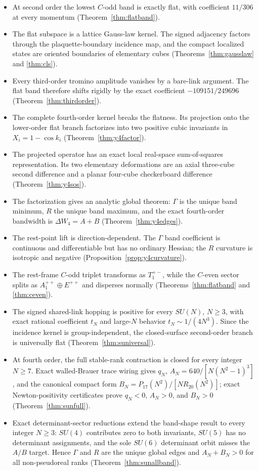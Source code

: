 \documentclass[11pt]{article}
\begin{document}
\begin{itemize}
\item[(A)] At second order the lowest $C$-odd band is exactly flat, with
coefficient $11/306$ at every momentum (Theorem~\ref{thm:flatband}).
\item[(B)] The flat subspace is a lattice Gauss-law kernel. The signed
adjacency factors through the plaquette-boundary incidence map, and the
compact localized states are oriented boundaries of elementary cubes
(Theorems~\ref{thm:gausslaw} and \ref{thm:cls}).
\item[(C)] Every third-order tromino amplitude vanishes by a bare-link
argument. The flat band therefore shifts rigidly by the exact coefficient
$-109151/249696$ (Theorem~\ref{thm:thirdorder}).
\item[(D)] The complete fourth-order kernel breaks the flatness. Its
projection onto the lower-order flat branch factorizes into two positive
cubic invariants in $X_i=1-\cos k_i$ (Theorem~\ref{thm:y4factor}).
\item[(E)] The projected operator has an exact local real-space
sum-of-squares representation. Its two elementary deformations are an axial
three-cube second difference and a planar four-cube checkerboard difference
(Theorem~\ref{thm:y4sos}).
\item[(F)] The factorization gives an analytic global theorem: $\Gamma$ is
the unique band minimum, $R$ the unique band maximum, and the exact
fourth-order bandwidth is $\Delta W_4=A+B$
(Theorem~\ref{thm:y4edges}).
\item[(G)] The rest-point lift is direction-dependent. The $\Gamma$ band
coefficient is continuous and differentiable but has no ordinary Hessian;
the $R$ curvature is isotropic and negative
(Proposition~\ref{prop:y4curvature}).
\item[(H)] The rest-frame $C$-odd triplet transforms as $T_1^{+-}$, while
the $C$-even sector splits as $A_1^{++}\oplus E^{++}$ and disperses normally
(Theorems~\ref{thm:flatband} and \ref{thm:ceven}).
\item[(I)] The signed shared-link hopping is positive for every $SU(N)$,
$N\geq3$, with exact rational coefficient $t_N$ and large-$N$ behavior
$t_N\sim1/(4N^3)$. Since the incidence kernel is group-independent, the
closed-surface second-order branch is universally flat
(Theorem~\ref{thm:suniversal}).
\item[(J)] At fourth order, the full stable-rank contraction is closed for
every integer $N\geq7$. Exact walled-Brauer trace wiring gives $q_N$,
$A_N=640/[N(N^2-1)^3]$, and the canonical compact form
$B_N=P_{17}(N^2)/[N R_{20}(N^2)]$; exact Newton-positivity certificates prove
$q_N<0$, $A_N>0$, and $B_N>0$ (Theorem~\ref{thm:sunfull}).
\item[(K)] Exact determinant-sector reductions extend the band-shape result
to every integer $N\geq3$: $SU(4)$ contributes zero to both invariants,
$SU(5)$ has no determinant assignments, and the sole $SU(6)$ determinant
orbit misses the $A/B$ target. Hence $\Gamma$ and $R$ are the unique global
edges and $A_N+B_N>0$ for all non-pseudoreal ranks
(Theorem~\ref{thm:sunallband}).
\end{itemize}
\end{document}
